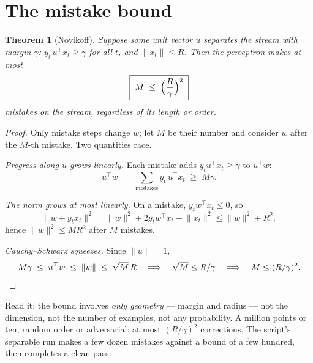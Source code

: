 \documentclass[11pt]{article}
\newtheorem{theorem}{Theorem}
\begin{document}
\section{The mistake bound}

\begin{theorem}[Novikoff]
Suppose some unit vector $u$ separates the stream with margin $\gamma$:
$y_t\, u^\top x_t \ge \gamma$ for all $t$, and $\lVert x_t\rVert \le R$.
Then the perceptron makes at most
\begin{equation}
  \boxed{\;M \;\le\; \Bigl(\frac{R}{\gamma}\Bigr)^{2}\;}
  \label{eq:novikoff}
\end{equation}
mistakes on the stream, regardless of its length or order.
\end{theorem}

\begin{proof}
Only mistake steps change $w$; let $M$ be their number and consider $w$
after the $M$-th mistake. Two quantities race.

\emph{Progress along $u$ grows linearly.} Each mistake adds
$y_t u^\top x_t \ge \gamma$ to $u^\top w$:
\begin{equation*}
  u^\top w \;=\; \sum_{\text{mistakes}} y_t\, u^\top x_t \;\ge\; M\gamma .
\end{equation*}

\emph{The norm grows at most linearly.} On a mistake,
$y_t w^\top x_t \le 0$, so
\begin{equation*}
  \lVert w + y_t x_t\rVert^2
  = \lVert w\rVert^2 + 2 y_t w^\top x_t + \lVert x_t\rVert^2
  \le \lVert w\rVert^2 + R^2 ,
\end{equation*}
hence $\lVert w\rVert^2 \le M R^2$ after $M$ mistakes.

\emph{Cauchy--Schwarz squeezes.} Since $\lVert u\rVert = 1$,
\begin{equation*}
  M\gamma \;\le\; u^\top w \;\le\; \lVert w\rVert \;\le\; \sqrt{M}\,R
  \quad\Longrightarrow\quad
  \sqrt{M} \le R/\gamma
  \quad\Longrightarrow\quad
  M \le (R/\gamma)^2 . \qedhere
\end{equation*}
\end{proof}

Read it: the bound involves \emph{only geometry} --- margin and radius
--- not the dimension, not the number of examples, not any probability.
A million points or ten, random order or adversarial: at most
$(R/\gamma)^2$ corrections. The script's separable run makes a few dozen
mistakes against a bound of a few hundred, then completes a clean pass.
\end{document}
